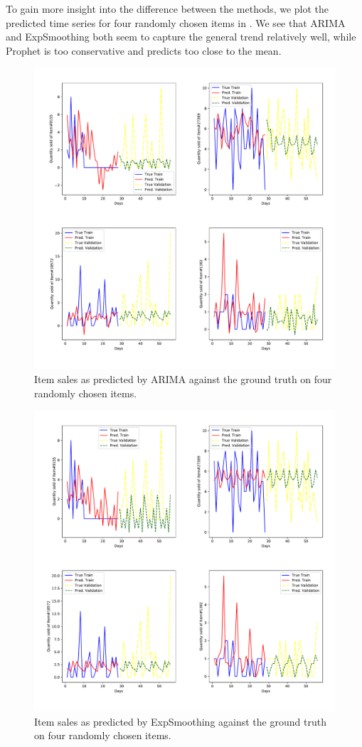 \documentclass[12pt]{article}
\begin{document}
To gain more insight into the difference between the methods, we plot the predicted time series for four randomly chosen items in . We see that ARIMA and ExpSmoothing both seem to capture the general trend relatively well, while Prophet is too conservative and predicts too close to the mean.

\begin{figure}[H]
  \centering
  \includegraphics[width=.8\linewidth]{sarimax-items}
  \caption{Item sales as predicted by ARIMA against the ground truth on four randomly chosen items.}
  \label{fig:arima-item-sales}
\end{figure}

\begin{figure}[H]
  \centering
  \includegraphics[width=.8\linewidth]{exp-sm-items}
  \caption{Item sales as predicted by ExpSmoothing against the ground truth on four randomly chosen items.}
  \label{fig:expsm-item-sales}
\end{figure}
\end{document}
